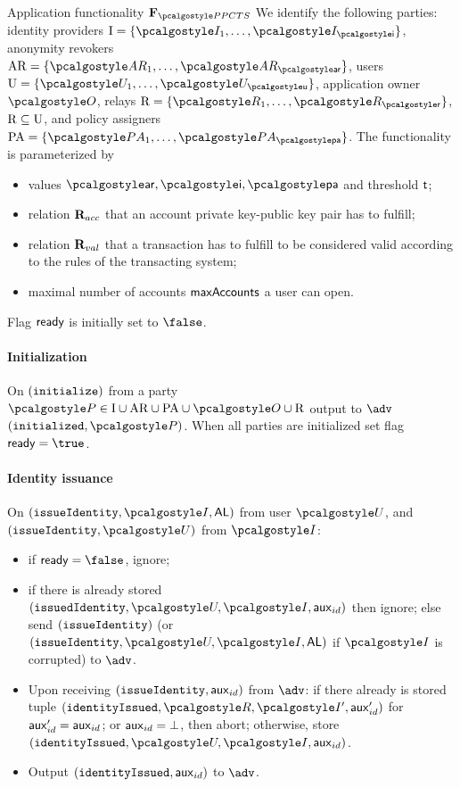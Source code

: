 \documentclass[runningheads,10pt]{llncs}
\numberwithin{equation}{section}
\begin{document}
\begin{funcbox}{Application functionality $\func{\PPCTS}$} We identify the
  following parties: identity providers $\partyset{I} = \smallset{\idprov_1,
  \ldots, \idprov_\noofidprov}$, anonymity revokers $\partyset{AR} =
  \smallset{\ar_1, \ldots, \ar_\noofar}$, users $\partyset{U} =
  \smallset{\user_1, \ldots, \user_\noofu}$, application owner $\owner$, relays
  $\partyset{R} = \smallset{\relay_1, \ldots, \relay_\noofr}$, $\mathrm{R}
  \subseteq \mathrm{U}$, and policy assigners $\partyset{PA} =
  \smallset{\polas_1, \ldots, \polas_\noofpolas}$.  The functionality is
  parameterized by
  \begin{itemize}
  \item values $\noofar, \noofidprov, \noofpolas$ and threshold $\mathsf{t}$;
  \item relation $\mathbf{R}_{acc}$ that an account private key-public key pair has to
    fulfill;
  \item relation $\mathbf{R}_{val}$ that a transaction has to fulfill to be considered
    valid according to the rules of the transacting system;
  \item maximal number of accounts $\mathsf{maxAccounts}$ a user can open.
  \end{itemize}
  Flag $\mathsf{ready}$ is initially set to $\false$.

  \paragraph{Initialization}
  On $(\mathtt{initialize})$ from a party $\party \in \partyset{I} \cup \partyset{AR}
  \cup \partyset{PA} \cup \owner \cup \partyset{R}$ output to $\adv$
  $(\initialized, \party)$. When all parties are initialized set flag $\ready =
  \true$.

  \paragraph{Identity issuance}
  On $(\issueIdentity, \idprov, \AL)$ from user $\user$, and $(\issueIdentity,
  \user)$ from $\idprov$:
  \begin{itemize}
  \item if $\ready = \false$, ignore;
  \item if there is already stored $(\issuedIdentity, \user, \idprov, \auxid)$
    then ignore; else send $(\mathtt{issueIdentity})$ (or $(\issueIdentity, \user,
    \idprov, \AL)$ if $\idprov$ is corrupted) to $\adv$.
  \item Upon receiving $(\mathtt{issueIdentity}, \mathsf{aux}_{id})$ from $\adv$: if there already
    is stored tuple $(\identityIssued, \relay, \idprov', \aux'_{id})$ for
    $\mathsf{aux}'_{id} = \mathsf{aux}_{id}$; or $\mathsf{aux}_{id} = \bot$, then abort; otherwise, store
    $(\identityIssued, \user, \idprov, \auxid)$.
  \item Output $(\mathtt{identityIssued}, \mathsf{aux}_{id})$ to $\adv$.
  \end{itemize}


\end{funcbox}
\end{document}
